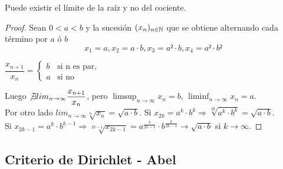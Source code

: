 \begin{eg}
  Puede existir el límite de la raíz y no del cociente.
  \begin{proof}
    Sean $0 < a < b$ y la sucesión $(x_n)_{n \in \mathbb{N}}$ que se obtiene alternando cada término por $a$ ó $b$ \begin{equation}
      x_1 = a, x_2 = a \cdot b, x_3 = a² \cdot b, x_4 = a² \cdot b²
    \end{equation}

    $\dfrac{x_{n+1}}{x_n} = \begin{cases}
        b & \text{si n es par}, \\
        a & \text{si no}
      \end{cases}$

    Luego $\not \exists lim_{n \to \infty} \dfrac{x_{n+1}}{x_n}$, pero $\limsup_{n \to \infty} x_n = b$, $\liminf_{n \to \infty} x_n = a$. \\
    Por otro lado $lim_{n \to \infty} \sqrt[n]{x_n} = \sqrt{a \cdot b}$. Si $x_{2k} = a^k \cdot b^k \Rightarrow \sqrt[2k]{a^k \cdot b^k} = \sqrt{a \cdot b}$. \\
    Si $x_{2k-1} = a^k \cdot b^{k-1} \Rightarrow \sqrt[2k-1]{x_{2k-1}} = a^{\frac{k}{2k-1}} \cdot b^{\frac{k}{2k-1}} \to \sqrt{a \cdot b}$ si $k \to \infty$.
  \end{proof}
\end{eg}

\subsection{Criterio de Dirichlet - Abel}

